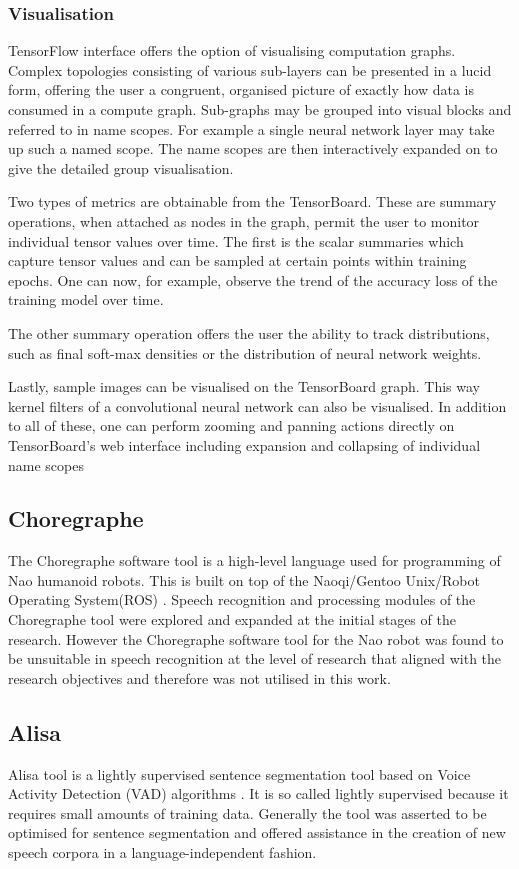 \subsubsection{Visualisation}
TensorFlow interface offers the option of visualising computation graphs. Complex topologies consisting of various sub-layers can be presented in a lucid form, offering the user a congruent, organised picture of exactly how data is consumed in a compute graph. Sub-graphs may be grouped into visual blocks and referred to in name scopes.  For example a single neural network layer may take up such a named scope. The name scopes are then interactively expanded on to give the detailed group visualisation.

Two types of metrics are obtainable from the TensorBoard. These are summary operations, when attached as nodes in the graph, permit the user to monitor individual tensor values over time.   The first is the scalar summaries which capture tensor values and can be sampled at certain points within training epochs. One can now, for example, observe the trend of the accuracy loss of the training model over time.

The other summary operation offers the user the ability to track distributions, such as final soft-max densities or the distribution of neural network weights. 

Lastly, sample images can be visualised on the TensorBoard graph. This way kernel filters of a convolutional neural network can also be visualised.  In addition to all of these, one can perform zooming and panning actions directly on TensorBoard's web interface including expansion and collapsing of individual name scopes

\subsection{Choregraphe}
The Choregraphe software tool is a high-level language used for programming of Nao humanoid robots.  This is built on top of the Naoqi/Gentoo Unix/Robot Operating System(ROS) \citep{pot2009choregraphe}.  Speech recognition and processing modules of the Choregraphe tool were explored and expanded at the initial stages of the research.  However the Choregraphe software tool for the Nao robot was found to be unsuitable in speech recognition at the level of research that aligned with the research objectives and therefore was not utilised in this work.

\subsection{Alisa}\label{sec_c3_alisa}
Alisa tool is a lightly supervised sentence segmentation tool based on Voice Activity Detection (VAD) algorithms \citep{stan2016alisa}.  It is so called lightly supervised because it requires small amounts of training data.  Generally the tool was asserted to be optimised for sentence segmentation and offered assistance in the creation of new speech corpora in a language-independent fashion. 

